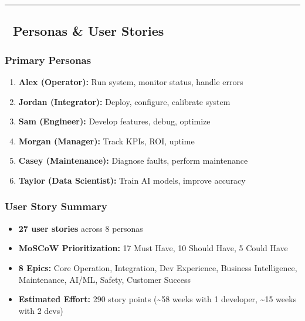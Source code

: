\documentclass[
]{article}
\providecommand{\tightlist}{%
  \setlength{\itemsep}{0pt}\setlength{\parskip}{0pt}}
\begin{document}
\begin{center}\rule{0.5\linewidth}{0.5pt}\end{center}

\hypertarget{personas-user-stories}{%
\subsection{👥 Personas \& User Stories}\label{personas-user-stories}}

\hypertarget{primary-personas}{%
\subsubsection{Primary Personas}\label{primary-personas}}

\begin{enumerate}
\def\labelenumi{\arabic{enumi}.}
\tightlist
\item
  \textbf{Alex (Operator):} Run system, monitor status, handle errors
\item
  \textbf{Jordan (Integrator):} Deploy, configure, calibrate system
\item
  \textbf{Sam (Engineer):} Develop features, debug, optimize
\item
  \textbf{Morgan (Manager):} Track KPIs, ROI, uptime
\item
  \textbf{Casey (Maintenance):} Diagnose faults, perform maintenance
\item
  \textbf{Taylor (Data Scientist):} Train AI models, improve accuracy
\end{enumerate}

\hypertarget{user-story-summary}{%
\subsubsection{User Story Summary}\label{user-story-summary}}

\begin{itemize}
\tightlist
\item
  \textbf{27 user stories} across 8 personas
\item
  \textbf{MoSCoW Prioritization:} 17 Must Have, 10 Should Have, 5 Could
  Have
\item
  \textbf{8 Epics:} Core Operation, Integration, Dev Experience,
  Business Intelligence, Maintenance, AI/ML, Safety, Customer Success
\item
  \textbf{Estimated Effort:} 290 story points (\textasciitilde58 weeks
  with 1 developer, \textasciitilde15 weeks with 2 devs)
\end{itemize}
\end{document}
